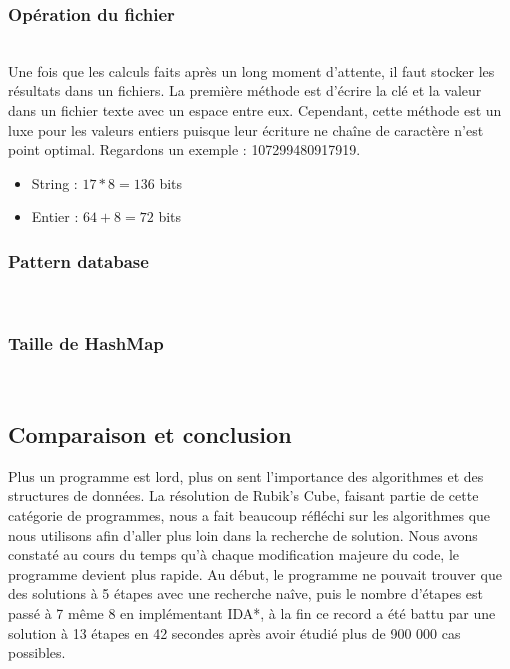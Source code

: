 \documentclass[fleqn,10pt,french]{SelfArx} %
\begin{document}
\subsubsection{Opération du fichier}

~\\\indent
Une fois que les calculs faits après un long moment d’attente, il faut stocker les résultats dans un fichiers. La première méthode est d’écrire la clé et la valeur dans un fichier texte avec un espace entre eux. Cependant, cette méthode est un luxe pour les valeurs entiers puisque leur écriture ne chaîne de caractère n’est point optimal. Regardons un exemple : 107299480917919.

\begin{itemize}[noitemsep] %
\item String :  $17 * 8 = 136$ bits
\item Entier : $64 + 8 = 72$ bits
\end{itemize}

\subsubsection{Pattern database}

~\\\indent


\subsubsection{Taille de HashMap}

~\\\indent


\subsection{Comparaison et conclusion}

Plus un programme est lord, plus on sent l’importance des algorithmes et des structures de données. La résolution de Rubik’s Cube, faisant partie de cette catégorie de programmes, nous a fait beaucoup réfléchi sur les algorithmes que nous utilisons afin d’aller plus loin dans la recherche de solution. Nous avons constaté au cours du temps qu’à chaque modification majeure du code, le programme devient plus rapide. Au début, le programme ne pouvait trouver que des solutions à 5 étapes avec une recherche naîve, puis le nombre d’étapes est passé à 7 même 8 en implémentant IDA*, à la fin ce record a été battu par une solution à 13 étapes en 42 secondes après avoir étudié plus de 900 000 cas possibles. 
\end{document}

